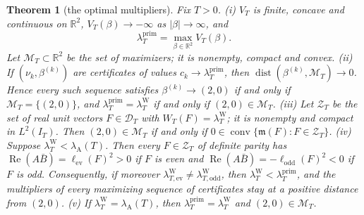 \documentclass[11pt]{amsart}
\newtheorem{theorem}{Theorem}[section]
\theoremstyle{definition}
\theoremstyle{remark}
\newcommand{\R}{\mathbb R}
\newcommand{\Rel}{\operatorname{Re}}
\newcommand{\IT}{I_T}
\newcommand{\lamP}{\lambda^{\mathrm{prim}}_T}
\newcommand{\lamW}{\lambda^{\mathrm W}_T}
\newcommand{\lamA}{\lambda_{\mathrm A}(T)}
\begin{document}
\begin{theorem}[the optimal multipliers]\label{thm:mult}
Fix $T>0$.
\emph{(i)} $V_T$ is finite, concave and continuous on $\R^2$, $V_T(\beta)\to-\infty$ as $|\beta|\to\infty$, and
\[
\lamP=\max_{\beta\in\R^2}V_T(\beta).
\]
Let $\mathcal M_T\subset\R^2$ be the set of maximizers; it is nonempty, compact and convex.
\emph{(ii)} If $(\nu_k,\beta^{(k)})$ are certificates of values $c_k\to\lamP$, then
$\operatorname{dist}(\beta^{(k)},\mathcal M_T)\to0$. Hence every such sequence satisfies $\beta^{(k)}\to(2,0)$ if and
only if $\mathcal M_T=\{(2,0)\}$, and $\lamP=\lamW$ if and only if $(2,0)\in\mathcal M_T$.
\emph{(iii)} Let $\mathcal Z_T$ be the set of real unit vectors $F\in\mathcal D_T$ with $W_T(F)=\lamW$; it is nonempty
and compact in $L^2(\IT)$. Then $(2,0)\in\mathcal M_T$ if and only if
$0\in\operatorname{conv}\{\mathfrak m(F):F\in\mathcal Z_T\}$.
\emph{(iv)} Suppose $\lamW<\lamA$. Then every $F\in\mathcal Z_T$ of definite parity has
$\Rel(A\bar B)=\ell_{\mathrm{ev}}(F)^2>0$ if $F$ is even and $\Rel(A\bar B)=-\ell_{\mathrm{odd}}(F)^2<0$ if $F$ is odd.
Consequently, if moreover $\lambda^{\mathrm W}_{T,\mathrm{ev}}\ne\lambda^{\mathrm W}_{T,\mathrm{odd}}$, then $\lamW<\lamP$, and
the multipliers of every maximizing sequence of certificates stay at a positive distance from $(2,0)$.
\emph{(v)} If $\lamW=\lamA$, then $\lamP=\lamW$ and $(2,0)\in\mathcal M_T$.
\end{theorem}
\end{document}
